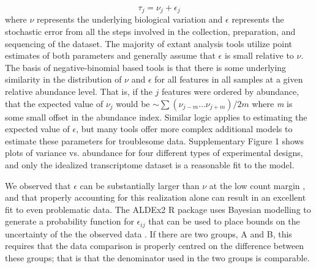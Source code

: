 \documentclass{bmcart}
\begin{document}
\begin{equation}
    \tau_{j} = \nu_j + \epsilon_j
\label{eq:dispersion}
\end{equation} 
where $\nu$ represents the underlying biological variation and $\epsilon$ represents the stochastic error  from all the steps involved in the collection, preparation, and sequencing of the dataset. The majority of extant analysis tools utilize point estimates of both parameters and generally assume that  $\epsilon$ is small relative to $\nu$.  The basis of negative-binomial based tools is that there is some underlying similarity in the distribution of $\nu$ and $\epsilon$  for all features in all samples at a given relative abundance level. That is, if the $j$ features were ordered by abundance, that the expected value of $\nu_j$ would be  $\sim \sum (\nu_{j-m}\ldots \nu_{j+m}) / 2m $ where \textit{m} is some small offset in the abundance index. Similar logic applies to estimating the expected value of $\epsilon$, but many tools offer  more complex additional models to estimate these parameters for troublesome data. Supplementary Figure 1 shows plots of variance vs. abundance for four different types of experimental designs, and only the idealized transcriptome dataset is a reasonable fit to the model. 

We  observed that $\epsilon$ can be substantially larger than $\nu$ at the low count margin \cite{fernandes:2013,gloorAJS:2016}, and that properly accounting for this realization alone can result in an excellent fit to even problematic data. 
The ALDEx2 R package  uses Bayesian modelling to generate a probability function for  $\epsilon_{ij}$ that can be used to place bounds on the uncertainty of the the observed data \cite{fernandes:2013,gloorAJS:2016}. If there are two groups, A and B,  this requires that the data comparison is properly centred on the difference between these groups; that is that the denominator used in the two groups is comparable.  

\end{document}
